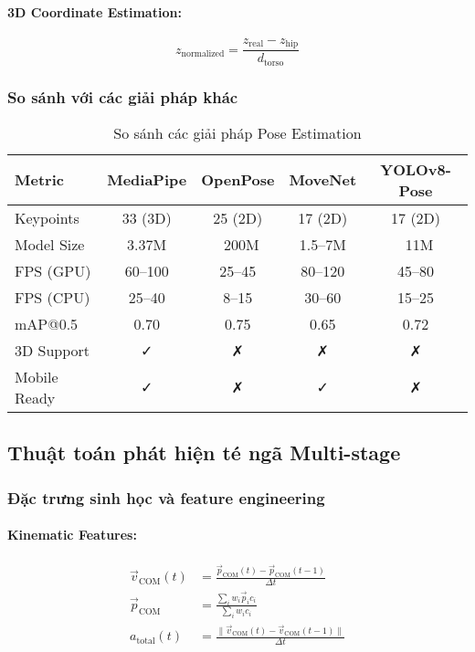 \paragraph{3D Coordinate Estimation:}
\begin{equation}
z_{\text{normalized}} = \frac{z_{\text{real}} - z_{\text{hip}}}{d_{\text{torso}}}
\end{equation}

\subsubsection{So sánh với các giải pháp khác}
\begin{table}[htbp]
\centering
\caption{So sánh các giải pháp Pose Estimation}
\begin{tabular}{|l|c|c|c|c|}
\hline
Metric & MediaPipe & OpenPose & MoveNet & YOLOv8-Pose \\
\hline
Keypoints & 33 (3D) & 25 (2D) & 17 (2D) & 17 (2D) \\
Model Size & 3.37M & ~200M & 1.5–7M & ~11M \\
FPS (GPU) & 60–100 & 25–45 & 80–120 & 45–80 \\
FPS (CPU) & 25–40 & 8–15 & 30–60 & 15–25 \\
mAP@0.5 & 0.70 & 0.75 & 0.65 & 0.72 \\
3D Support & ✓ & ✗ & ✗ & ✗ \\
Mobile Ready & ✓ & ✗ & ✓ & ✗ \\
\hline
\end{tabular}
\end{table}


\subsection{Thuật toán phát hiện té ngã Multi-stage}

\subsubsection{Đặc trưng sinh học và feature engineering}

\paragraph{Kinematic Features:}
\begin{align}
\vec{v}_{\text{COM}}(t) &= \frac{\vec{p}_{\text{COM}}(t) - \vec{p}_{\text{COM}}(t-1)}{\Delta t} \\
\vec{p}_{\text{COM}} &= \frac{\sum_i w_i \vec{p}_i c_i}{\sum_i w_i c_i} \\
a_{\text{total}}(t) &= \frac{\|\vec{v}_{\text{COM}}(t) - \vec{v}_{\text{COM}}(t-1)\|}{\Delta t}
\end{align}

